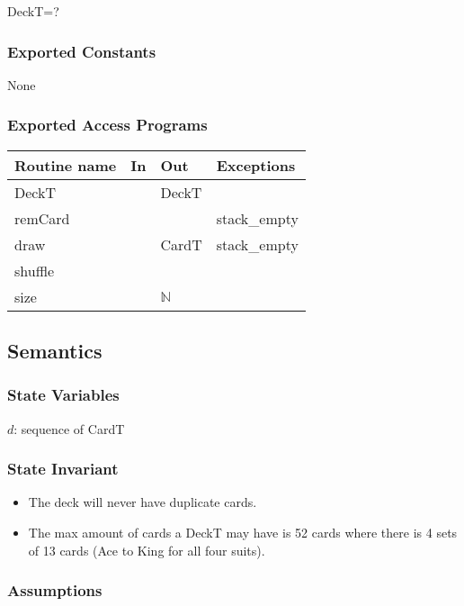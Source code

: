 \documentclass[12pt]{article}
\begin{document}
DeckT=?

\subsubsection*{Exported Constants}

None

\subsubsection*{Exported Access Programs}

\begin{tabular}{| l | l | l | l |}
    \hline
    \textbf{Routine name} & \textbf{In} & \textbf{Out} & \textbf{Exceptions}\\
    \hline
    DeckT & ~ & DeckT & ~\\
    \hline
    remCard & ~ & ~ & stack\_empty\\
    \hline
    draw & ~ & CardT & stack\_empty\\
    \hline
    shuffle & ~ & ~ & ~\\
    \hline
    size & & $\mathbb{N}$ & ~\\
    \hline
\end{tabular}

\subsection* {Semantics}

\subsubsection* {State Variables}

$d$: sequence of CardT

\subsubsection* {State Invariant}

\begin{itemize}
  \item The deck will never have duplicate cards.
  \item The max amount of cards a DeckT may have is 52 cards where
  there is 4 sets of 13 cards (Ace to King for all four suits).
\end{itemize}

\subsubsection* {Assumptions}
\end{document}
